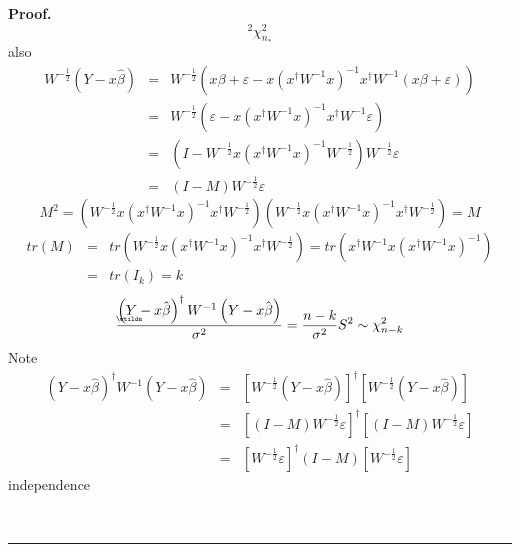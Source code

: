 \documentclass{article}
\newenvironment{proof}[1][Proof]{\noindent\textbf{#1.} }{\ \rule{0.5em}{0.5em}}
\begin{document}
\begin{proof}
\begin{equation*}
^{2}\chi _{n_{\ast }}^{2}
\end{equation*}%
also%
\begin{eqnarray*}
W^{-\frac{1}{2}}\left( Y-x\hat{\beta}\right) &=&W^{-\frac{1}{2}}\left(
x\beta +\varepsilon -x\left( x^{\dagger }W^{-1}x\right) ^{-1}x^{\dagger
}W^{-1}\left( x\beta +\varepsilon \right) \right) \\
&=&W^{-\frac{1}{2}}\left( \varepsilon -x\left( x^{\dagger }W^{-1}x\right)
^{-1}x^{\dagger }W^{-1}\varepsilon \right) \\
&=&\left( I-W^{-\frac{1}{2}}x\left( x^{\dagger }W^{-1}x\right) ^{-1}W^{-%
\frac{1}{2}}\right) W^{-\frac{1}{2}}\varepsilon \\
&=&\left( I-M\right) W^{-\frac{1}{2}}\varepsilon
\end{eqnarray*}%
\begin{equation*}
M^{2}=\left( W^{-\frac{1}{2}}x\left( x^{\dagger }W^{-1}x\right)
^{-1}x^{\dagger }W^{-\frac{1}{2}}\right) \left( W^{-\frac{1}{2}}x\left(
x^{\dagger }W^{-1}x\right) ^{-1}x^{\dagger }W^{-\frac{1}{2}}\right) =M
\end{equation*}%
\begin{eqnarray*}
tr\left( M\right) &=&tr\left( W^{-\frac{1}{2}}x\left( x^{\dagger
}W^{-1}x\right) ^{-1}x^{\dagger }W^{-\frac{1}{2}}\right) =tr\left(
x^{\dagger }W^{-1}x\left( x^{\dagger }W^{-1}x\right) ^{-1}\right) \\
&=&tr\left( I_{k}\right) =k
\end{eqnarray*}%
\begin{equation*}
\frac{\left( 
\underaccent{\wtilde}{Y}%
-x\hat{\beta}\right) ^{\dagger }W^{-1}\left( Y-x\hat{\beta}\right) }{\sigma
^{2}}=\frac{n-k}{\sigma ^{2}}S^{2}\sim \chi _{n-k}^{2}
\end{equation*}%
Note%
\begin{eqnarray*}
\left( Y-x\hat{\beta}\right) ^{\dagger }W^{-1}\left( Y-x\hat{\beta}\right)
&=&\left[ W^{-\frac{1}{2}}\left( Y-x\hat{\beta}\right) \right] ^{\dagger }%
\left[ W^{-\frac{1}{2}}\left( Y-x\hat{\beta}\right) \right] \\
&=&\left[ \left( I-M\right) W^{-\frac{1}{2}}\varepsilon \right] ^{\dagger }%
\left[ \left( I-M\right) W^{-\frac{1}{2}}\varepsilon \right] \\
&=&\left[ W^{-\frac{1}{2}}\varepsilon \right] ^{\dagger }\left( I-M\right) %
\left[ W^{-\frac{1}{2}}\varepsilon \right]
\end{eqnarray*}%
independence\newline

\end{proof}
\end{document}
